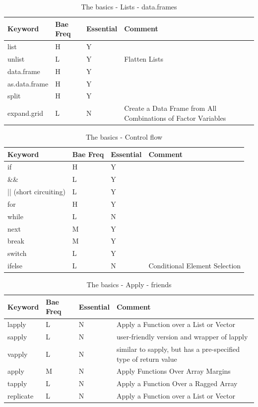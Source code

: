 \documentclass[10pt,]{krantz}
\theoremstyle{definition}
\theoremstyle{definition}
\theoremstyle{remark}
\begin{document}
\begin{table}

\caption{\label{tab:knitchunk9}The basics - Lists - data.frames }
\centering
\begin{tabular}[t]{llll}
\toprule
Keyword & Bae Freq & Essential & Comment\\
\midrule
list & H & Y & \\
unlist & L & Y & Flatten Lists\\
data.frame & H & Y & \\
as.data.frame & H & Y & \\
split & H & Y & \\
expand.grid & L & N & Create a Data Frame from All Combinations of Factor Variables\\
\bottomrule
\end{tabular}
\end{table}

\begin{table}

\caption{\label{tab:knitchunk10}The basics - Control flow }
\centering
\begin{tabular}[t]{llll}
\toprule
Keyword & Bae Freq & Essential & Comment\\
\midrule
if & H & Y & \\
\&\& & L & Y & \\
|| (short circuiting) & L & Y & \\
for & H & Y & \\
while & L & N & \\
\addlinespace
next & M & Y & \\
break & M & Y & \\
switch & L & Y & \\
ifelse & L & N & Conditional Element Selection\\
\bottomrule
\end{tabular}
\end{table}

\begin{table}

\caption{\label{tab:knitchunk11}The basics - Apply - friends}
\centering
\begin{tabular}[t]{llll}
\toprule
Keyword & Bae Freq & Essential & Comment\\
\midrule
lapply & L & N & Apply a Function over a List or Vector\\
sapply & L & N & user-friendly version and wrapper of lapply\\
vapply & L & N & similar to sapply, but has a pre-specified type of return value\\
apply & M & N & Apply Functions Over Array Margins\\
tapply & L & N & Apply a Function Over a Ragged Array\\
replicate & L & N & Apply a Function over a List or Vector\\
\bottomrule
\end{tabular}
\end{table}
\end{document}
